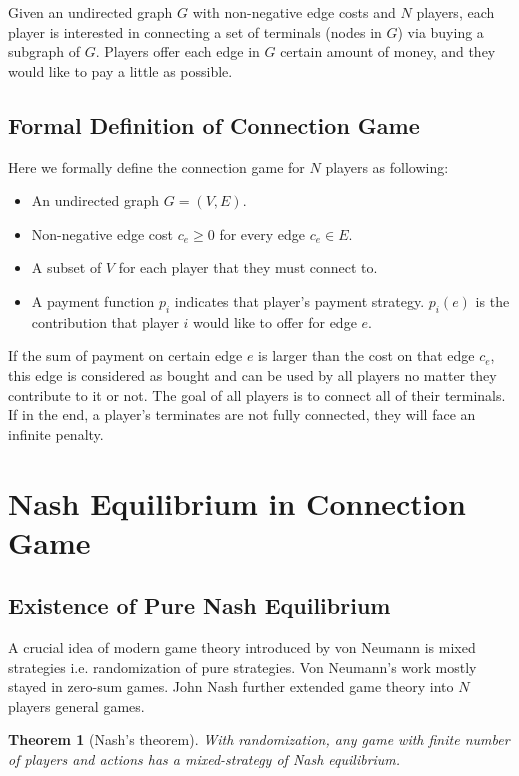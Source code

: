 \documentclass[11pt,psfig,times]{article}
\newtheorem{theorem}{Theorem}[section]
\begin{document}
Given an undirected graph \(G\) with non-negative edge costs and \(N\) players, each player is interested in connecting a set of terminals (nodes in \(G\)) via buying a subgraph of \(G\). Players offer each edge in \(G\) certain amount of money, and they would like to pay a little as possible. 

\subsection{Formal Definition of Connection Game}
Here we formally define the connection game for \(N\) players as following:
\begin{itemize}
	\item An undirected graph \(G = (V,E)\).
	\item Non-negative edge cost \(c_e \geq 0\) for every edge $c_e \in E$.
	\item A subset of \(V\) for each player that they must connect to. 
	\item A payment function \(p_i\) indicates that player's payment strategy. \(p_i(e)\) is the contribution that player \(i\) would like to offer for edge \(e\).
\end{itemize}

If the sum of payment on certain edge \(e\) is larger than the cost on that edge \(c_e\), this edge is considered as bought and can be used by all players no matter they contribute to it or not. The goal of all players is to connect all of their terminals. If in the end, a player's terminates are not fully connected, they will face an infinite penalty.  

\section{Nash Equilibrium in Connection Game}
\subsection{Existence of Pure Nash Equilibrium}

A crucial idea of modern game theory introduced by von Neumann is mixed strategies i.e. randomization of pure strategies. Von Neumann's work mostly stayed in zero-sum games. John Nash further extended game theory into \(N\) players general games.  
\begin{theorem}[Nash's theorem]
	With randomization, any game with finite number of players and actions has a mixed-strategy of Nash equilibrium.
\end{theorem}
\end{document}
